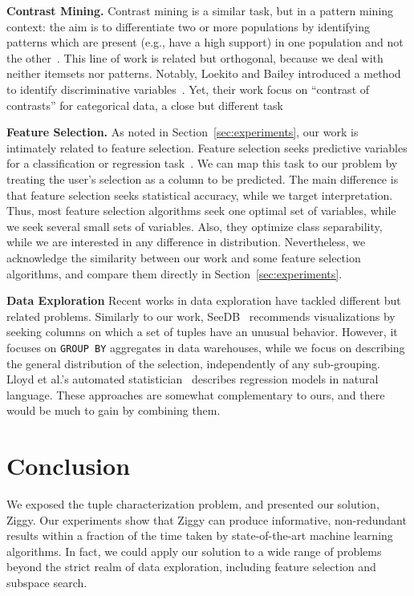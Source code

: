 \textbf{Contrast Mining.} Contrast mining is a similar task, but in a pattern
mining context: the aim is to differentiate two or more populations by
identifying patterns which are present (e.g., have a high support) in one
population and not the
other~\cite{vreeken2007characterising,webb2008detecting}. This line of work is
related but orthogonal, because we deal with neither itemsets nor patterns.
Notably, Loekito and Bailey introduced a  method to identify discriminative 
variables~\cite{loekito2008mining}.  Yet, their work focus on ``contrast of
contrasts'' for categorical data, a close but different task

\textbf{Feature Selection.} As noted in Section~\ref{sec:experiments}, our work
is intimately related to feature selection. Feature selection seeks predictive
variables for a classification or regression task~\cite{guyon2003introduction}.
We can map this task to our problem by treating the user's selection as a
column to be predicted. The main difference is that feature selection seeks
statistical accuracy, while we target interpretation. Thus, most feature
selection algorithms seek one optimal set of variables, while we seek several
small sets of variables. Also, they optimize class separability,
while we are interested in any difference in distribution. Nevertheless, we
acknowledge the similarity between our work and some feature selection
algorithms, and compare them directly in Section~\ref{sec:experiments}.

\textbf{Data Exploration} Recent works in data exploration have tackled
different but related problems. Similarly to our work,
SeeDB~\cite{vartak2015see} re\-com\-mends visualizations by seeking co\-lumns
on which a set of tuples have an unusual behavior. However, it focuses on
\texttt{GROUP BY} aggregates in data warehouses, while we focus on describing
the general distribution of the selection, independently of any sub-grouping. Lloyd
et al.'s automated statistician~\cite{Lloyd2014ABCD} describes regression
models in natural language. These approaches are somewhat complementary to
ours, and there would be much to gain by combining them.


\section{Conclusion}
\label{sec:conclusions}
We exposed the tuple characterization problem, and presented our solution,
Ziggy. Our experiments show that Ziggy can produce informative, non-redundant
results within a fraction of the time taken by state-of-the-art machine
learning algorithms. In fact,  we could apply our solution to a wide range of
problems beyond the strict realm of data exploration, including feature
selection and subspace search.

